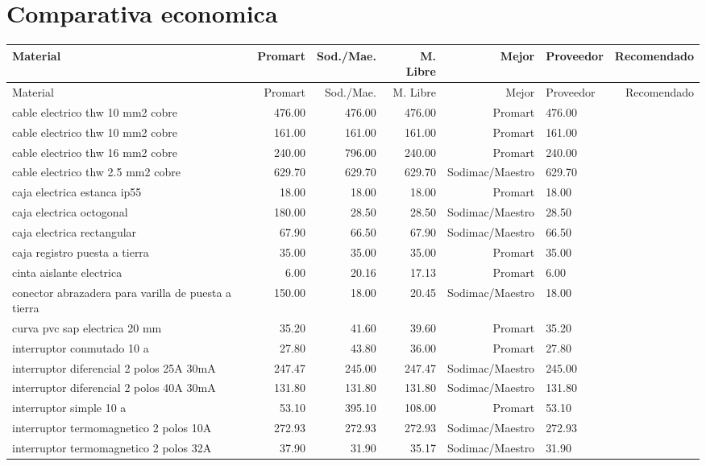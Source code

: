 \section{Comparativa economica}
\scriptsize
\begin{longtable}{p{4.5cm}rrrrp{2.5cm}r}
\toprule Material & Promart & Sod./Mae. & M. Libre & Mejor & Proveedor & Recomendado \\ \midrule
\endfirsthead\toprule Material & Promart & Sod./Mae. & M. Libre & Mejor & Proveedor & Recomendado \\ \midrule\endhead
cable electrico thw 10 mm2 cobre & 476.00 & 476.00 & 476.00 & Promart & 476.00 \\
cable electrico thw 10 mm2 cobre & 161.00 & 161.00 & 161.00 & Promart & 161.00 \\
cable electrico thw 16 mm2 cobre & 240.00 & 796.00 & 240.00 & Promart & 240.00 \\
cable electrico thw 2.5 mm2 cobre & 629.70 & 629.70 & 629.70 & Sodimac/Maestro & 629.70 \\
caja electrica estanca ip55 & 18.00 & 18.00 & 18.00 & Promart & 18.00 \\
caja electrica octogonal & 180.00 & 28.50 & 28.50 & Sodimac/Maestro & 28.50 \\
caja electrica rectangular & 67.90 & 66.50 & 67.90 & Sodimac/Maestro & 66.50 \\
caja registro puesta a tierra & 35.00 & 35.00 & 35.00 & Promart & 35.00 \\
cinta aislante electrica & 6.00 & 20.16 & 17.13 & Promart & 6.00 \\
conector abrazadera para varilla de puesta a tierra & 150.00 & 18.00 & 20.45 & Sodimac/Maestro & 18.00 \\
curva pvc sap electrica 20 mm & 35.20 & 41.60 & 39.60 & Promart & 35.20 \\
interruptor conmutado 10 a & 27.80 & 43.80 & 36.00 & Promart & 27.80 \\
interruptor diferencial 2 polos 25A 30mA & 247.47 & 245.00 & 247.47 & Sodimac/Maestro & 245.00 \\
interruptor diferencial 2 polos 40A 30mA & 131.80 & 131.80 & 131.80 & Sodimac/Maestro & 131.80 \\
interruptor simple 10 a & 53.10 & 395.10 & 108.00 & Promart & 53.10 \\
interruptor termomagnetico 2 polos 10A & 272.93 & 272.93 & 272.93 & Sodimac/Maestro & 272.93 \\
interruptor termomagnetico 2 polos 32A & 37.90 & 31.90 & 35.17 & Sodimac/Maestro & 31.90 \\

\end{longtable}
